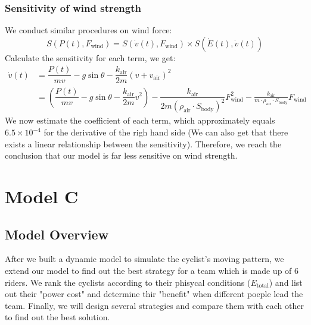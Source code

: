 \documentclass{article}
\begin{document}
			\subsubsection{Sensitivity of wind strength}
				We conduct similar procedures on wind force:
				\[
					S\left( P\left( t \right) ,F_{\mathrm{wind}} \right) =S\left( \dot{v}\left( t \right) ,F_{\mathrm{wind}} \right) \times S\left( \dot{E}\left( t \right) ,\dot{v}\left( t \right) \right)
				\]
				Calculate the sensitivity for each term, we get:\
				\[
					\begin{aligned}
						\dot{v}\left( t \right) &=\dfrac{P\left( t \right)}{mv}-g\sin \theta -\dfrac{k_{\mathrm{air}}}{2m}\left( v+v_{\mathrm{air}} \right) ^2
						\\
						&=\left( \dfrac{P\left( t \right)}{mv}-g\sin \theta -\dfrac{k_{\mathrm{air}}}{2m}v^2 \right) -\dfrac{k_{\mathrm{air}}}{2m\left( \rho _{\mathrm{air}}\cdot S_{\mathrm{body}} \right) ^2}F_{\mathrm{wind}}^{2}-\frac{k_{\mathrm{air}}}{m\cdot \rho _{\mathrm{air}}\cdot S_{\mathrm{body}}}F_{\mathrm{wind}}
					\end{aligned}
				\]
				We now estimate the coefficient of each term, which approximately equals \(6.5\times 10^{-4}\) for the derivative of the righ hand side (We can also get that there exists a linear relationship between the sensitivity). Therefore, we reach the conclusion that our model is far less sensitive on wind strength.












	\section{Model C}
		\subsection{Model Overview}
			After we built a dynamic model to simulate the cyclist's moving pattern, we extend our model to find out the best strategy for a team which is made up of 6 riders. We rank the cyclists according to their phisycal conditions ($E_\mathrm{total}$) and list out their "power cost" and determine thir "benefit" when different poeple lead the team. Finally, we will design several strategies and compare them with each other to find out the best solution.
\end{document}
